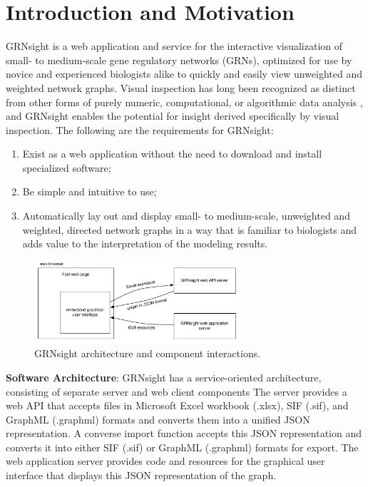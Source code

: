 \documentclass[sigconf,review,anonymous]{acmart}
\begin{document}
\section{Introduction and Motivation}

GRNsight is a web application and service for the interactive visualization of small- to medium-scale gene regulatory networks (GRNs), optimized for use by novice and experienced biologists alike to quickly and easily view unweighted and weighted network graphs. Visual inspection has long been recognized as distinct from other forms of purely numeric, computational, or algorithmic data analysis \cite{Tufte:1986:VDQ:33404, card1999readings}, and GRNsight enables the potential for insight derived specifically by visual inspection. The following are the requirements for GRNsight:

\begin{enumerate}
\item Exist as a web application without the need to download and install specialized software;
\item Be simple and intuitive to use;
\item Automatically lay out and display small- to medium-scale, unweighted and weighted, directed network graphs in a way that is familiar to biologists and adds value to the interpretation of the modeling results.
\end{enumerate}

\begin{figure}[ht]
   \centering
   \includegraphics[width=3in]{GRNsight-Architecture.pdf} 
   \caption{GRNsight architecture and component interactions.}
   \label{fig:architecture}
\end{figure}


\textbf{Software Architecture}: GRNsight has a service-oriented architecture, consisting of separate server and web client components The server provides a web API that accepts files in Microsoft Excel workbook (.xlsx), SIF (.sif), and GraphML (.graphml) formats and converts them into a unified JSON representation. A converse import function accepts this JSON representation and converts it into either SIF (.sif) or GraphML (.graphml) formats for export. The web application server provides code and resources for the graphical user interface that displays this JSON representation of the graph.\\
\end{document}

